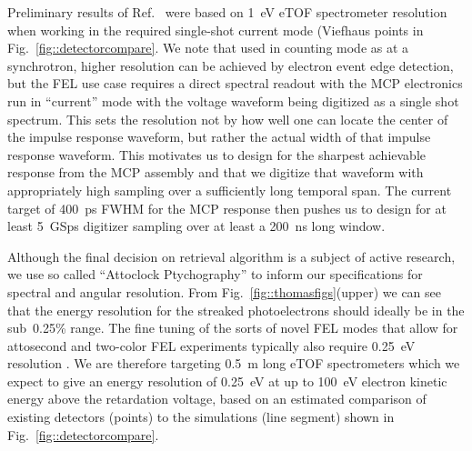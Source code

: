 Preliminary results of Ref.~\cite{Nick2018} were based on 1~eV eTOF spectrometer resolution when working in the required single-shot current mode (Viefhaus points in Fig.~\ref{fig::detectorcompare}.
We note that used in counting mode as at a synchrotron, higher resolution can be achieved by electron event edge detection, but the FEL use case requires a direct spectral readout with the MCP electronics run in ``current'' mode with the voltage waveform being digitized as a single shot spectrum.
This sets the resolution not by how well one can locate the center of the impulse response waveform, but rather the actual width of that impulse response waveform.
This motivates us to design for the sharpest achievable response from the MCP assembly and that we digitize that waveform with appropriately high sampling over a sufficiently long temporal span.
The current target of 400~ps FWHM for the MCP response then pushes us to design for at least 5~GSps digitizer sampling over at least a 200~ns long window.

Although the final decision on retrieval algorithm is a subject of active research, we use so called ``Attoclock Ptychography'' \cite{Feurer2018} to inform our specifications for spectral and angular resolution.
From Fig.~\ref{fig::thomasfigs}(upper) we can see that the energy resolution for the streaked photoelectrons should ideally be in the sub~0.25\% range.
The fine tuning of the sorts of novel FEL modes that allow for attosecond \cite{xLEAP} and two-color \cite{LutmanFreshSlice2016} FEL experiments typically also require 0.25~eV resolution \cite{AlbertoPrivate}.
We are therefore targeting 0.5~m long eTOF spectrometers which we expect to give an energy resolution of 0.25~eV at up to 100~eV electron kinetic energy above the retardation voltage, based on an estimated comparison of existing detectors (points) to the simulations (line segment) shown in Fig.~\ref{fig::detectorcompare}.

